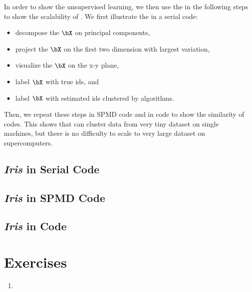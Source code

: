 In order to show the unsupervised learning, we then use the 
in the following steps to show the scalability of .
We first illustrate the  in a serial code:
\begin{itemize}
\item decompose the $\bX$ on principal components,
\item project the $\bX$ on the first two dimension with largest variation,
\item visualize the $\bX$ on the x-y plane,
\item label $\bX$ with true ids, and
\item label $\bX$ with estimated ids clustered by algorithms.
\end{itemize}
Then, we repeat these steps in SPMD code and in  code
to show the similarity of codes.
This shows that 
can cluster data from very tiny dataset on single machines, but there is
no difficulty to scale to very large dataset on supercomputers.




\subsection{{\it Iris} in Serial Code}




\subsection{{\it Iris} in SPMD Code}




\subsection{{\it Iris} in  Code}




\section{Exercises}
\label{sec:pmclust_exercise}

\begin{enumerate}[label=\thechapter-\arabic*]
\item

\end{enumerate}

